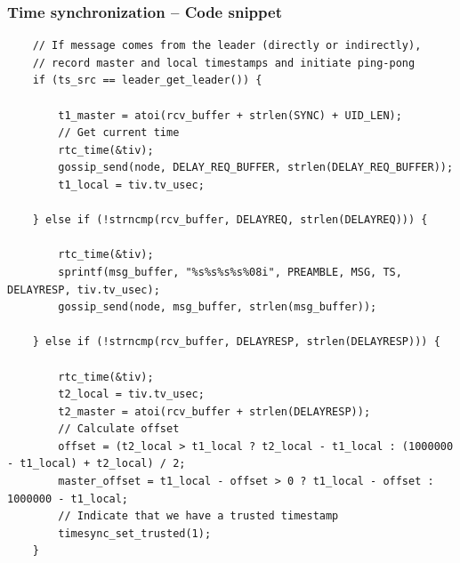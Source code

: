 \documentclass[ngerman,xcolor=svgnames]{beamer}
\begin{document}


\begin{frame}[fragile]
  \frametitle{Time synchronization -- Code snippet}
  \begin{lstlisting}
    // If message comes from the leader (directly or indirectly),
    // record master and local timestamps and initiate ping-pong
    if (ts_src == leader_get_leader()) {

        t1_master = atoi(rcv_buffer + strlen(SYNC) + UID_LEN);
        // Get current time
        rtc_time(&tiv);
        gossip_send(node, DELAY_REQ_BUFFER, strlen(DELAY_REQ_BUFFER));
        t1_local = tiv.tv_usec;

    } else if (!strncmp(rcv_buffer, DELAYREQ, strlen(DELAYREQ))) {

        rtc_time(&tiv);
        sprintf(msg_buffer, "%s%s%s%s%08i", PREAMBLE, MSG, TS, DELAYRESP, tiv.tv_usec);
        gossip_send(node, msg_buffer, strlen(msg_buffer));

    } else if (!strncmp(rcv_buffer, DELAYRESP, strlen(DELAYRESP))) {

        rtc_time(&tiv);
        t2_local = tiv.tv_usec;
        t2_master = atoi(rcv_buffer + strlen(DELAYRESP));
        // Calculate offset
        offset = (t2_local > t1_local ? t2_local - t1_local : (1000000 - t1_local) + t2_local) / 2;
        master_offset = t1_local - offset > 0 ? t1_local - offset : 1000000 - t1_local;
        // Indicate that we have a trusted timestamp
        timesync_set_trusted(1);
    }
  \end{lstlisting}
\end{frame}
\end{document}
